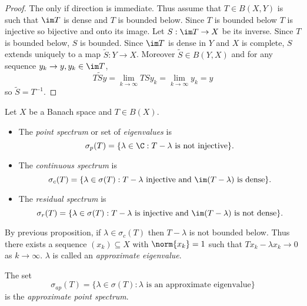 \documentclass[a4paper]{article}
\begin{document}
\begin{proof}
  The only if direction is immediate. Thus assume that \(T \in B(X, Y)\) is such that \(\im T\) is dense and \(T\) is bounded below. Since \(T\) is bounded below \(T\) is injective so bijective and onto its image. Let \(S: \im T \to X\) be its inverse. Since \(T\) is bounded below, \(S\) is bounded. Since \(\im T\) is dense in \(Y\) and \(X\) is complete, \(S\) extends uniquely to a map \(\tilde S: Y \to X\). Moreover \(\tilde S \in B(Y, X)\) and for any sequence \(y_k \to y, y_k \in \im T\),
  \[
    T \tilde S y = \lim_{k \to \infty} TS y_k = \lim_{k \to \infty} y_k = y
  \]
  so \(\tilde S = T^{-1}\).
\end{proof}

\begin{definition}
  Let \(X\) be a Banach space and \(T \in B(X)\).
  \begin{itemize}
  \item The \emph{point spectrum} or set of \emph{eigenvalues} is
    \[
      \sigma_p(T) = \{\lambda \in \C: T - \lambda \text{ is not injective}\}.
    \]
  \item The \emph{continuous spectrum} is
    \[
      \sigma_c(T) = \{\lambda \in \sigma(T): T - \lambda \text{ injective and } \im (T - \lambda) \text{ is dense}\}.
    \]
  \item The \emph{residual spectrum} is
    \[
      \sigma_r(T) = \{\lambda \in \sigma(T): T - \lambda \text{ is injective and } \im (T - \lambda) \text{ is not dense}\}.
    \]
  \end{itemize}
\end{definition}

\begin{remark}
  By previous proposition, if \(\lambda \in \sigma_c(T)\) then \(T - \lambda\) is not bounded below. %
  Thus there exists a sequence \((x_k) \subseteq X\) with \(\norm{x_k} = 1\) such that \(T x_k - \lambda x_k \to 0\) as \(k \to \infty\). \(\lambda\) is called an \emph{approximate eigenvalue}.

  The set
  \[
    \sigma_{ap}(T) = \{\lambda \in \sigma(T): \lambda \text{ is an approximate eigenvalue}\}
  \]
  is the \emph{approximate point spectrum}.
\end{remark}
\end{document}
